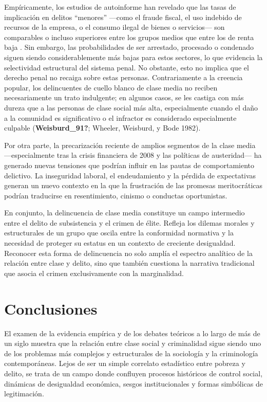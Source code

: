 \documentclass[
  spanish,
  letterpaper,
  DIV=11,
  numbers=noendperiod]{scrreprt}
\begin{document}
Empíricamente, los estudios de autoinforme han revelado que las tasas de
implicación en delitos ``menores'' ---como el fraude fiscal, el uso
indebido de recursos de la empresa, o el consumo ilegal de bienes o
servicios--- son comparables o incluso superiores entre los grupos
medios que entre los de renta baja . Sin embargo, las probabilidades de
ser arrestado, procesado o condenado siguen siendo considerablemente más
bajas para estos sectores, lo que evidencia la selectividad estructural
del sistema penal. No obstante, esto no implica que el derecho penal no
recaiga sobre estas personas. Contrariamente a la creencia popular, los
delincuentes de cuello blanco de clase media no reciben necesariamente
un trato indulgente; en algunos casos, se les castiga con más dureza que
a las personas de clase social más alta, especialmente cuando el daño a
la comunidad es significativo o el infractor es considerado
especialmente culpable (\textbf{Weisburd\_91?}; Wheeler, Weisburd, y
Bode 1982).

Por otra parte, la precarización reciente de amplios segmentos de la
clase media ---especialmente tras la crisis financiera de 2008 y las
políticas de austeridad--- ha generado nuevas tensiones que podrían
influir en las pautas de comportamiento delictivo. La inseguridad
laboral, el endeudamiento y la pérdida de expectativas generan un nuevo
contexto en la que la frustración de las promesas meritocráticas podrían
traducirse en resentimiento, cinismo o conductas oportunistas.

En conjunto, la delincuencia de clase media constituye un campo
intermedio entre el delito de subsistencia y el crimen de élite. Refleja
los dilemas morales y estructurales de un grupo que oscila entre la
conformidad normativa y la necesidad de proteger su estatus en un
contexto de creciente desigualdad. Reconocer esta forma de delincuencia
no solo amplía el espectro analítico de la relación entre clase y
delito, sino que también cuestiona la narrativa tradicional que asocia
el crimen exclusivamente con la marginalidad.

\section{Conclusiones}\label{conclusiones}

El examen de la evidencia empírica y de los debates teóricos a lo largo
de más de un siglo muestra que la relación entre clase social y
criminalidad sigue siendo uno de los problemas más complejos y
estructurales de la sociología y la criminología contemporáneas. Lejos
de ser un simple correlato estadístico entre pobreza y delito, se trata
de un campo donde confluyen procesos históricos de control social,
dinámicas de desigualdad económica, sesgos institucionales y formas
simbólicas de legitimación.
\end{document}
